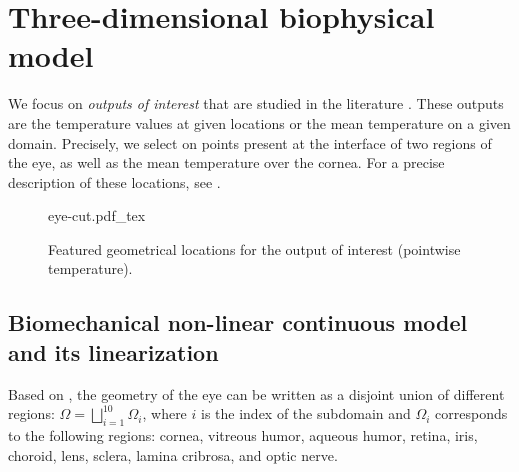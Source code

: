 \section{Three-dimensional biophysical model}
\label{sec:model-phys}




We focus on \emph{outputs of interest} that are studied in the literature \cite{Scott_1988, NG2006268}.
These outputs are the temperature values at given locations or the mean temperature on a given domain.
Precisely, we select on points present at the interface of two regions of the eye, as well as the mean temperature over the cornea.
For a precise description of these locations, see .


\begin{figure}
    \centering
    \def\svgwidth{0.5\columnwidth}
    {eye-cut.pdf_tex}
    \caption{Featured geometrical locations for the output of interest (pointwise temperature).}
    \label{fig:outputs}
\end{figure}




\subsection{Biomechanical non-linear continuous model and its linearization}

Based on , the geometry of the eye can be written as a disjoint union of different regions:
$\Omega = \bigsqcup_{i=1}^{10} \Omega_i$, where $i$ is the index of the subdomain and $\Omega_i$ corresponds to the following regions: cornea, vitreous humor, aqueous humor, retina, iris, choroid, lens, sclera, lamina cribrosa, and optic nerve.



